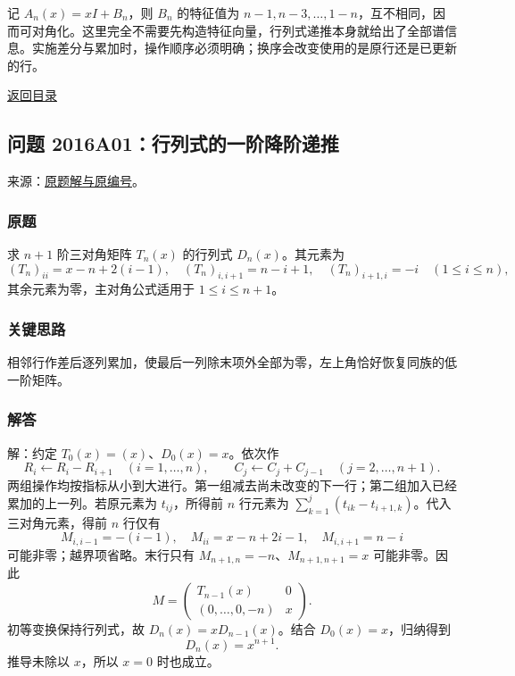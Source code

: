 \documentclass[11pt,a4paper]{article}
\begin{document}
记 \(A_n(x)=xI+B_n\)，则 \(B_n\) 的特征值为
\(n-1,n-3,\ldots,1-n\)，互不相同，因而可对角化。这里完全不需要先构造特征向量，行列式递推本身就给出了全部谱信息。实施差分与累加时，操作顺序必须明确；换序会改变使用的是原行还是已更新的行。

\noindent\hyperref[contents]{返回目录}

\subsection{问题
2016A01：行列式的一阶降阶递推}\label{ux95eeux9898-2016a01ux884cux5217ux5f0fux7684ux4e00ux9636ux964dux9636ux9012ux63a8}

来源：\href{https://zj139.github.io/math-notes/files/problems/16S17-16S20_16A01-16A03.pdf\#page=7}{原题解与原编号}。

\subsubsection{原题}\label{ux539fux9898-31}

求 \(n+1\) 阶三对角矩阵 \(T_n(x)\) 的行列式 \(D_n(x)\)。其元素为 \[
(T_n)_{ii}=x-n+2(i-1),\quad
(T_n)_{i,i+1}=n-i+1,\quad
(T_n)_{i+1,i}=-i\quad(1\le i\le n),
\] 其余元素为零，主对角公式适用于 \(1\le i\le n+1\)。

\subsubsection{关键思路}\label{ux5173ux952eux601dux8def-31}

相邻行作差后逐列累加，使最后一列除末项外全部为零，左上角恰好恢复同族的低一阶矩阵。

\subsubsection{解答}\label{ux89e3ux7b54-31}

解：约定 \(T_0(x)=(x)\)、\(D_0(x)=x\)。依次作 \[
R_i\leftarrow R_i-R_{i+1}\quad(i=1,\ldots,n),\qquad
C_j\leftarrow C_j+C_{j-1}\quad(j=2,\ldots,n+1).
\]
两组操作均按指标从小到大进行。第一组减去尚未改变的下一行；第二组加入已经累加的上一列。若原元素为
\(t_{ij}\)，所得前 \(n\) 行元素为
\(\sum_{k=1}^{j}(t_{ik}-t_{i+1,k})\)。代入三对角元素，得前 \(n\) 行仅有
\[
M_{i,i-1}=-(i-1),\quad M_{ii}=x-n+2i-1,\quad M_{i,i+1}=n-i
\] 可能非零；越界项省略。末行只有 \(M_{n+1,n}=-n\)、\(M_{n+1,n+1}=x\)
可能非零。因此 \[
M=\begin{pmatrix}T_{n-1}(x)&0\\(0,\ldots,0,-n)&x\end{pmatrix}.
\] 初等变换保持行列式，故 \(D_n(x)=xD_{n-1}(x)\)。结合
\(D_0(x)=x\)，归纳得到 \[\boxed{D_n(x)=x^{n+1}.}\] 推导未除以
\(x\)，所以 \(x=0\) 时也成立。
\end{document}
